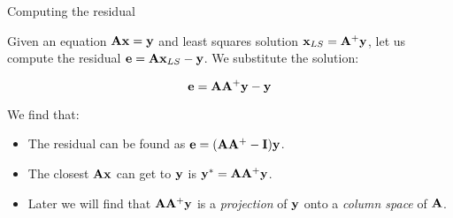 \documentclass{beamer}
\begin{document}
\begin{frame}{Computing the residual}
	\begin{flushleft}
		
		Given an equation $\mathbf{A}\mathbf{x} = \mathbf{y}$ and least squares solution $\mathbf{x}_{LS} = \mathbf{A}^+\mathbf{y}$, let us compute the residual $\mathbf{e} = \mathbf{A}\mathbf{x}_{LS} - \mathbf{y}$. We substitute the solution:
		 
		\begin{equation}
			\mathbf{e} = \mathbf{A}\mathbf{A}^+\mathbf{y} - \mathbf{y}
		\end{equation}
		
		We find that:
		
		\begin{itemize}
			\item The residual can be found as $\mathbf{e} = (\mathbf{A}\mathbf{A}^+ - \mathbf{I})\mathbf{y}$.
			
			\item The closest $\mathbf{A}\mathbf{x}$ can get to $\mathbf{y}$ is $\mathbf{y}^* = \mathbf{A}\mathbf{A}^+\mathbf{y}$.
			
			\item Later we will find that $\mathbf{A}\mathbf{A}^+\mathbf{y}$ is a \emph{projection} of $\mathbf{y}$ onto a \emph{column space} of $\mathbf{A}$.
		\end{itemize}
		
	\end{flushleft}
\end{frame}





%
%
%
%
\end{document}
